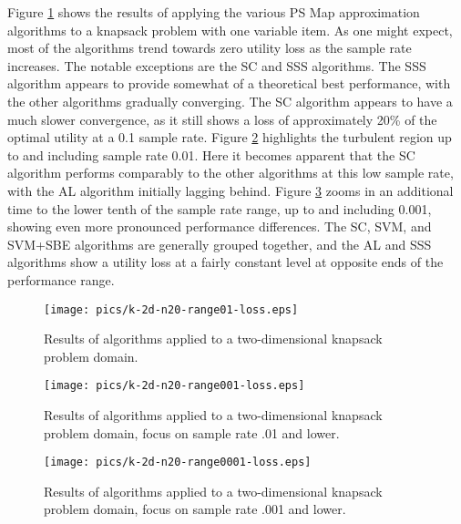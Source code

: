 Figure \ref{fig:knapsack-2d-range01-loss} shows the results of applying the various PS Map approximation algorithms to a knapsack problem with one variable item.  As one might expect, most of the algorithms trend towards zero utility loss as the sample rate increases.  The notable exceptions are the SC and SSS algorithms. The SSS algorithm appears to provide somewhat of a theoretical best performance, with the other algorithms gradually converging.  The SC algorithm appears to have a much slower convergence, as it still shows a loss of approximately 20\% of the optimal utility at a 0.1 sample rate.  Figure \ref{fig:knapsack-2d-range001-loss} highlights the turbulent region up to and including sample rate 0.01.  Here it becomes apparent that the SC algorithm performs comparably to the other algorithms at this low sample rate, with the AL algorithm initially lagging behind.  Figure \ref{fig:knapsack-2d-range0001-loss} zooms in an additional time to the lower tenth of the sample rate range, up to and including 0.001, showing even more pronounced performance differences.  The SC, SVM, and SVM+SBE algorithms are generally grouped together, and the AL and SSS algorithms show a utility loss at a fairly constant level at opposite ends of the performance range.

\begin{figure}
\begin{center}
\texttt{[image: pics/k-2d-n20-range01-loss.eps]}
\caption{Results of algorithms applied to a two-dimensional knapsack problem domain.}
\label{fig:knapsack-2d-range01-loss}
\end{center}
\end{figure}

\begin{figure}
\begin{center}
\texttt{[image: pics/k-2d-n20-range001-loss.eps]}
\caption{Results of algorithms applied to a two-dimensional knapsack problem domain, focus on sample rate .01 and lower.}
\label{fig:knapsack-2d-range001-loss}
\end{center}
\end{figure}

\begin{figure}
\begin{center}
\texttt{[image: pics/k-2d-n20-range0001-loss.eps]}
\caption{Results of algorithms applied to a two-dimensional knapsack problem domain, focus on sample rate .001 and lower.}
\label{fig:knapsack-2d-range0001-loss}
\end{center}
\end{figure}

